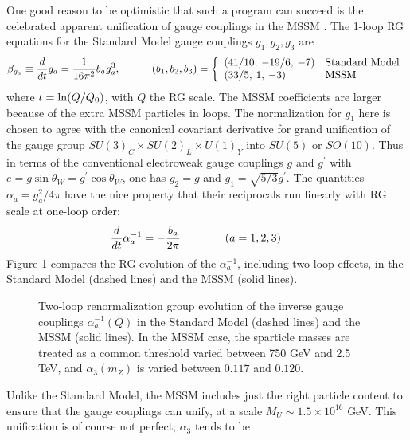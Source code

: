 \documentclass[11pt]{article}
\def\beq{\begin{eqnarray}}
\def\eeq{\end{eqnarray}}
\begin{document}
One good reason to be optimistic that such a program can succeed is the
celebrated apparent unification of gauge couplings in the MSSM
\cite{gaugeunification}. The 1-loop RG equations for the Standard Model
gauge couplings $g_1, g_2, g_3$ are 
\beq
\beta_{g_a} \equiv {d\over dt} g_a =  {1\over 16\pi^2} b_a g_a^3, 
\qquad\quad 
(b_1, b_2, b_3) = 
\left \{ \begin{array}{ll}
(41/10,\> -19/6,\> -7) & \mbox{Standard Model}\\
(33/5,\> 1,\> -3) & \mbox{MSSM}
\end{array}
\right.
\label{mssmg}
\eeq
where $t= {\rm ln} (Q/Q_0)$, with $Q$ the RG scale. The MSSM 
coefficients are larger because of the extra MSSM
particles in loops. The normalization for $g_1$ here is chosen to agree
with the canonical covariant derivative for grand unification of the gauge
group $SU(3)_C \times SU(2)_L\times U(1)_Y$ into $SU(5)$ or $SO(10)$. Thus
in terms of the conventional electroweak gauge couplings $g$ and
$g^\prime$ with $e = g\sin\theta_W = g^\prime \cos\theta_W$, one has
$g_2=g$ and $g_1 = \sqrt{5/3} g^\prime$. The quantities $\alpha_a =
g_a^2/4\pi$ have the nice property that their reciprocals run linearly
with RG scale at one-loop order:
\beq
{d\over dt} \alpha_a^{-1} = -{b_a\over 2\pi} \qquad\qquad (a=1,2,3)
\qquad
\label{mssmgrecip}
\eeq  
Figure \ref{fig:gaugeunification} compares the RG evolution of the 
$\alpha_a^{-1}$, including two-loop effects, in the Standard Model (dashed 
lines) and the MSSM (solid lines). 
\begin{figure}
\begin{minipage}[]{0.355\linewidth} 
\caption{Two-loop renormalization group evolution of the inverse gauge 
couplings 
$\alpha_a^{-1}(Q)$ in
the Standard Model (dashed lines) and the MSSM (solid lines). In the MSSM
case, the sparticle masses are treated as a common threshold varied 
between 750 GeV and 2.5 TeV, and $\alpha_3(m_Z)$ is varied between 
$0.117$ and $0.120$. 
\label{fig:gaugeunification}}
\end{minipage}
\begin{minipage}[]{0.64\linewidth} 
\hspace{.06\linewidth}
{} 
\end{minipage}
\end{figure}%
Unlike the Standard Model, the MSSM 
includes just the right particle content to ensure that the gauge 
couplings can unify, at a scale $M_U \sim 1.5\times 10^{16}$ GeV. 
This unification is of course not perfect; $\alpha_3$ tends to be 
\end{document}
